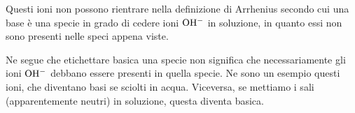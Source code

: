 Questi ioni non possono rientrare nella definizione di Arrhenius secondo cui una base è una specie in grado di cedere ioni $\rm OH^-$ in soluzione, in quanto essi non sono presenti nelle speci appena viste.

Ne segue che etichettare basica una specie non significa che necessariamente gli ioni $\rm OH^-$ debbano essere presenti in quella specie. Ne sono un esempio questi ioni, che diventano basi se sciolti in acqua. Viceversa, se mettiamo i sali (apparentemente neutri) in soluzione, questa diventa basica.